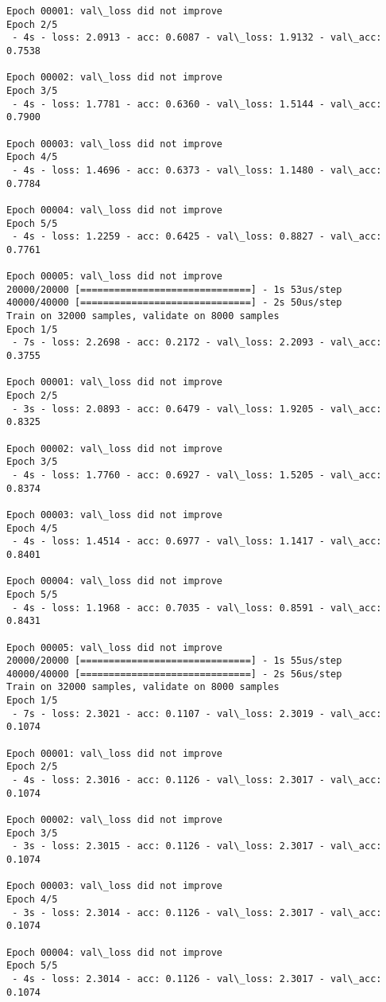 \documentclass[11pt]{article}
\begin{document}
\begin{Verbatim}[commandchars=\\\{\}]
Epoch 00001: val\_loss did not improve
Epoch 2/5
 - 4s - loss: 2.0913 - acc: 0.6087 - val\_loss: 1.9132 - val\_acc: 0.7538

Epoch 00002: val\_loss did not improve
Epoch 3/5
 - 4s - loss: 1.7781 - acc: 0.6360 - val\_loss: 1.5144 - val\_acc: 0.7900

Epoch 00003: val\_loss did not improve
Epoch 4/5
 - 4s - loss: 1.4696 - acc: 0.6373 - val\_loss: 1.1480 - val\_acc: 0.7784

Epoch 00004: val\_loss did not improve
Epoch 5/5
 - 4s - loss: 1.2259 - acc: 0.6425 - val\_loss: 0.8827 - val\_acc: 0.7761

Epoch 00005: val\_loss did not improve
20000/20000 [==============================] - 1s 53us/step
40000/40000 [==============================] - 2s 50us/step
Train on 32000 samples, validate on 8000 samples
Epoch 1/5
 - 7s - loss: 2.2698 - acc: 0.2172 - val\_loss: 2.2093 - val\_acc: 0.3755

Epoch 00001: val\_loss did not improve
Epoch 2/5
 - 3s - loss: 2.0893 - acc: 0.6479 - val\_loss: 1.9205 - val\_acc: 0.8325

Epoch 00002: val\_loss did not improve
Epoch 3/5
 - 4s - loss: 1.7760 - acc: 0.6927 - val\_loss: 1.5205 - val\_acc: 0.8374

Epoch 00003: val\_loss did not improve
Epoch 4/5
 - 4s - loss: 1.4514 - acc: 0.6977 - val\_loss: 1.1417 - val\_acc: 0.8401

Epoch 00004: val\_loss did not improve
Epoch 5/5
 - 4s - loss: 1.1968 - acc: 0.7035 - val\_loss: 0.8591 - val\_acc: 0.8431

Epoch 00005: val\_loss did not improve
20000/20000 [==============================] - 1s 55us/step
40000/40000 [==============================] - 2s 56us/step
Train on 32000 samples, validate on 8000 samples
Epoch 1/5
 - 7s - loss: 2.3021 - acc: 0.1107 - val\_loss: 2.3019 - val\_acc: 0.1074

Epoch 00001: val\_loss did not improve
Epoch 2/5
 - 4s - loss: 2.3016 - acc: 0.1126 - val\_loss: 2.3017 - val\_acc: 0.1074

Epoch 00002: val\_loss did not improve
Epoch 3/5
 - 3s - loss: 2.3015 - acc: 0.1126 - val\_loss: 2.3017 - val\_acc: 0.1074

Epoch 00003: val\_loss did not improve
Epoch 4/5
 - 3s - loss: 2.3014 - acc: 0.1126 - val\_loss: 2.3017 - val\_acc: 0.1074

Epoch 00004: val\_loss did not improve
Epoch 5/5
 - 4s - loss: 2.3014 - acc: 0.1126 - val\_loss: 2.3017 - val\_acc: 0.1074


\end{Verbatim}
\end{document}
